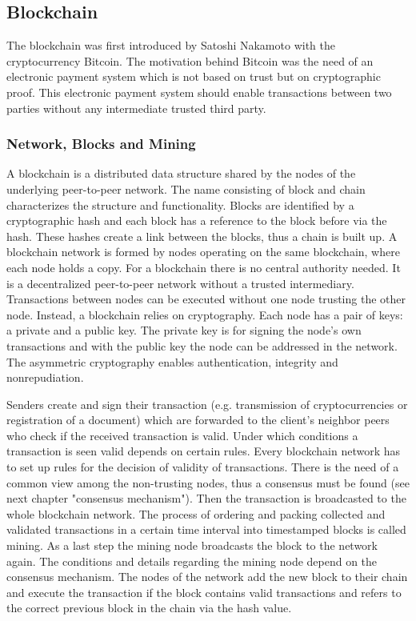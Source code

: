 \documentclass[conference]{IEEEtran}
\begin{document}
\subsection{Blockchain}
The blockchain was first introduced by Satoshi Nakamoto with the cryptocurrency Bitcoin. The motivation behind Bitcoin was the need of an electronic payment system which is not based on trust but on cryptographic proof. This electronic payment system should enable transactions between two parties without any intermediate trusted third party. \cite{Nakamoto2008}
\subsubsection{Network, Blocks and Mining}
A blockchain is a distributed data structure shared by the nodes of the underlying peer-to-peer network. The name consisting of block and chain characterizes the structure and functionality. Blocks are identified by a cryptographic hash and each block has a reference to the block before via the hash. These hashes create a link between the blocks, thus a chain is built up. A blockchain network is formed by nodes operating on the same blockchain, where each node holds a copy. For a blockchain there is no central authority needed. It is a decentralized peer-to-peer network without a trusted intermediary. Transactions between nodes can be executed without one node trusting the other node. Instead, a blockchain relies on cryptography. Each node has a pair of keys: a private and a public key. The private key is for signing the node's own transactions and with the public key the node can be addressed in the network. The asymmetric cryptography enables authentication, integrity and nonrepudiation.  \cite{Christidis2016} \par
Senders create and sign their transaction (e.g. transmission of cryptocurrencies or registration of a document) which are forwarded to the client's neighbor peers who check if the received transaction is valid. Under which conditions a transaction is seen valid depends on certain rules. Every blockchain network has to set up rules for the decision of validity of transactions. There is the need of a common view among the non-trusting nodes, thus a consensus must be found (see next chapter "consensus mechanism"). Then the transaction is broadcasted to the whole blockchain network. The process of ordering and packing collected and validated transactions in a certain time interval into timestamped blocks is called mining. As a last step the mining node broadcasts the block to the network again. The conditions and details regarding the mining node depend on the consensus mechanism. The nodes of the network add the new block to their chain and execute the transaction if the block contains valid transactions and refers to the correct previous block in the chain via the hash value. \cite{Christidis2016} \cite{Prinz2017} \par
\end{document}
